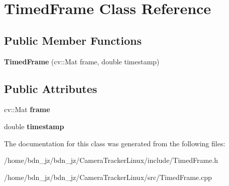 \hypertarget{classTimedFrame}{}\section{Timed\+Frame Class Reference}
\label{classTimedFrame}
\subsection*{Public Member Functions}
\begin{DoxyCompactItemize}
\item 
\mbox{\label{classTimedFrame_aeb70857af8b4f157785c6e0d3fcc8d53}} 
{\bfseries Timed\+Frame} (cv\+::\+Mat frame, double timestamp)
\end{DoxyCompactItemize}
\subsection*{Public Attributes}
\begin{DoxyCompactItemize}
\item 
\mbox{\label{classTimedFrame_a4c73ac094ec94f9be6558208b4916a36}} 
cv\+::\+Mat {\bfseries frame}
\item 
\mbox{\label{classTimedFrame_a126b8150949e1bd734778de55496b90c}} 
double {\bfseries timestamp}
\end{DoxyCompactItemize}


The documentation for this class was generated from the following files\+:\begin{DoxyCompactItemize}
\item 
/home/bdn\+\_\+jz/bdn\+\_\+jz/\+Camera\+Tracker\+Linux/include/Timed\+Frame.\+h\item 
/home/bdn\+\_\+jz/bdn\+\_\+jz/\+Camera\+Tracker\+Linux/src/Timed\+Frame.\+cpp\end{DoxyCompactItemize}
